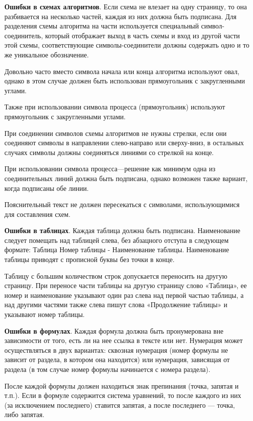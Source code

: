 \textbf{Ошибки в схемах алгоритмов}. Если схема не влезает на одну страницу, то она разбивается на несколько частей, каждая из них должна быть подписана. Для разделения схемы алгоритма на части используется специальный символ-соединитель, который отображает выход в часть схемы и вход из другой части этой схемы, соответствующие символы-соединители должны содержать одно и то же уникальное обозначение.

Довольно часто вместо символа начала или конца алгоритма используют овал, однако в этом случае должен быть использован прямоугольник с закругленными углами.

Также при использовании символа процесса (прямоугольник) используют прямоугольник с закругленными углами.

При соединении символов схемы алгоритмов не нужны стрелки, если они соединяют символы в направлении слево-направо или сверху-вниз, в остальных случаях символы должны соединяться линиями со стрелкой на конце.

При использовании символа процесса---решение как минимум одна из соединительных линий должна быть подписана, однако возможен также вариант, когда подписаны обе линии.

Пояснительный текст не должен пересекаться с символами, использующимися для составления схем.

\textbf{Ошибки в таблицах}. Каждая таблица должна быть подписана. Наименование следует помещать над таблицей слева, без абзацного отступа в следующем формате: Таблица Номер таблицы - Наименование таблицы. Наименование таблицы приводят с прописной буквы без точки в конце.

Таблицу с большим количеством строк допускается переносить на другую страницу. При переносе части таблицы на другую страницу слово «Таблица», ее номер и наименование указывают один раз слева над первой частью таблицы, а над другими частями также слева пишут слова «Продолжение таблицы» и указывают номер таблицы.

\textbf{Ошибки в формулах}. Каждая формула должна быть пронумерована вне зависимости от того, есть ли на нее ссылка в тексте или нет. Нумерация может осуществляться в двух вариантах: сквозная нумерация (номер формулы не зависит от раздела, в котором она находится) или нумерация, зависящая от раздела (в том случае номер формулы начинается с номера раздела).

После каждой формулы должен находиться знак препинания (точка, запятая и т.п.). Если в формуле содержится система уравнений, то после каждого из них (за исключением последнего) ставится запятая, а после последнего --- точка, либо запятая.


